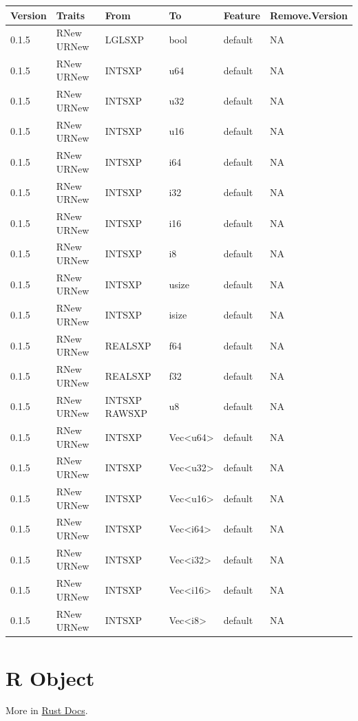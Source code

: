 \documentclass[]{book}
\begin{document}
\begin{tabular}{l|l|l|l|l|l}
\hline
Version & Traits & From & To & Feature & Remove.Version\\
\hline
0.1.5 & RNew URNew & LGLSXP & bool & default & NA\\
\hline
0.1.5 & RNew URNew & INTSXP & u64 & default & NA\\
\hline
0.1.5 & RNew URNew & INTSXP & u32 & default & NA\\
\hline
0.1.5 & RNew URNew & INTSXP & u16 & default & NA\\
\hline
0.1.5 & RNew URNew & INTSXP & i64 & default & NA\\
\hline
0.1.5 & RNew URNew & INTSXP & i32 & default & NA\\
\hline
0.1.5 & RNew URNew & INTSXP & i16 & default & NA\\
\hline
0.1.5 & RNew URNew & INTSXP & i8 & default & NA\\
\hline
0.1.5 & RNew URNew & INTSXP & usize & default & NA\\
\hline
0.1.5 & RNew URNew & INTSXP & isize & default & NA\\
\hline
0.1.5 & RNew URNew & REALSXP & f64 & default & NA\\
\hline
0.1.5 & RNew URNew & REALSXP & f32 & default & NA\\
\hline
0.1.5 & RNew URNew & INTSXP RAWSXP & u8 & default & NA\\
\hline
0.1.5 & RNew URNew & INTSXP & Vec<u64> & default & NA\\
\hline
0.1.5 & RNew URNew & INTSXP & Vec<u32> & default & NA\\
\hline
0.1.5 & RNew URNew & INTSXP & Vec<u16> & default & NA\\
\hline
0.1.5 & RNew URNew & INTSXP & Vec<i64> & default & NA\\
\hline
0.1.5 & RNew URNew & INTSXP & Vec<i32> & default & NA\\
\hline
0.1.5 & RNew URNew & INTSXP & Vec<i16> & default & NA\\
\hline
0.1.5 & RNew URNew & INTSXP & Vec<i8> & default & NA\\
\hline
\end{tabular}

\chapter{R Object}\label{r-object}

More in \href{https://docs.rustr.org/rustr/}{Rust Docs}.
\end{document}

